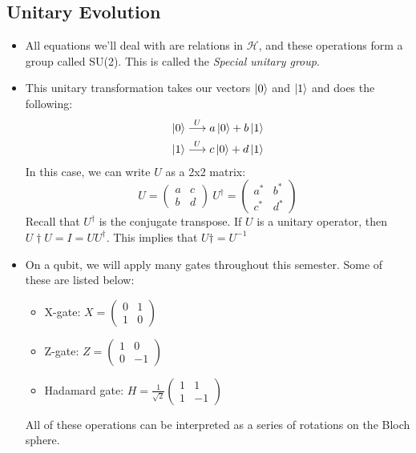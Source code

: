 \subsection{Unitary Evolution}
\begin{itemize}
	\item All equations we'll deal with are relations in \( \mathcal H \), and these operations form a group 
		called SU(2). This is called the \textit{Special unitary group}.
	\item This unitary transformation takes our vectors \( \ket{0} \) and \( \ket{1} \) and does the following:
		\begin{align*}
			\ket{0} &\overset{U}{\longrightarrow} a\ket{0} + b\ket{1}\\
			\ket{1} &\overset{U}{\longrightarrow} c\ket{0} + d\ket{1}
		\end{align*}
		In this case, we can write \( U \) as a 2x2 matrix:
		\[
			U = \begin{pmatrix} a & c\\ b& d \end{pmatrix} \ 
			U^\dagger = \begin{pmatrix} a^* & b^*\\c^* & d^* \end{pmatrix} 
		\] 
		Recall that \( U^{\dagger} \) is the conjugate transpose. If \( U \) is a unitary operator, then 
		\( U\dagger U = I = U U^{\dagger}\). This implies that \( U\dagger = U^{-1} \) 
	\item On a qubit, we will apply many gates throughout this semester. Some of these are listed below:
		\begin{itemize}
			\item X-gate: \( X = \begin{pmatrix} 0 & 1 \\ 1& 0 \end{pmatrix}  \) 
			\item Z-gate: \( Z = \begin{pmatrix} 1 & 0 \\ 0 & -1 \end{pmatrix}  \) 
			\item Hadamard gate: \( H = \frac{1}{\sqrt{2} }\begin{pmatrix} 1&1\\1&-1 \end{pmatrix}  \)
		\end{itemize}
		All of these operations can be interpreted as a series of rotations on the Bloch sphere.
\end{itemize}
